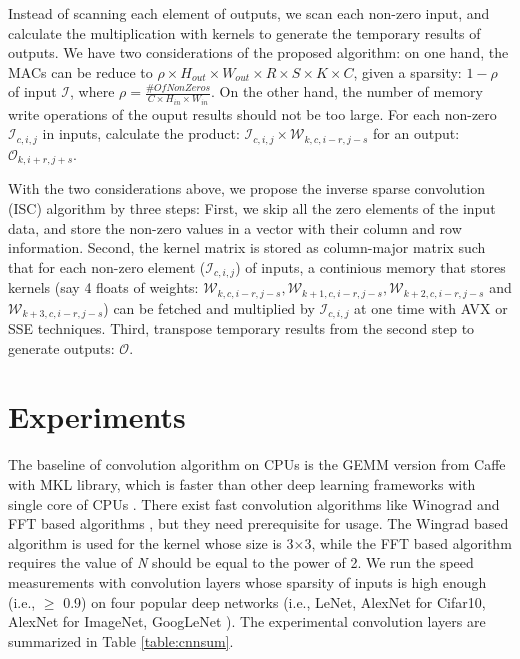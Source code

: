 \documentclass{article}
\begin{document}
Instead of scanning each element of outputs, we scan each non-zero input, and calculate the multiplication with kernels to generate the temporary results of outputs. We have two considerations of the proposed algorithm: on one hand, the MACs can be reduce to $\rho\times H_{out}\times W_{out} \times R \times S \times K \times C$, given a sparsity: $1-\rho$ of input $\mathcal{I}$, where $\rho=\frac{\#OfNonZeros}{C\times H_{in}\times W_{in}}$. On the other hand, the number of memory write operations of the ouput results should not be too large. For each non-zero $\mathcal{I}_{c,i,j}$ in inputs, calculate the product: $\mathcal{I}_{c,i,j}\times \mathcal{W}_{k,c,i-r,j-s}$ for an output: $\mathcal{O}_{k,i+r,j+s}$. 

With the two considerations above, we propose the inverse sparse convolution (ISC) algorithm by three steps: First, we skip all the zero elements of the input data, and store the non-zero values in a vector with their column and row information. Second, the kernel matrix is stored as column-major matrix such that for each non-zero element ($\mathcal{I}_{c,i,j}$) of inputs, a continious memory that stores kernels (say 4 floats of weights: $\mathcal{W}_{k,c,i-r,j-s},\mathcal{W}_{k+1,c,i-r,j-s},\mathcal{W}_{k+2,c,i-r,j-s}$ and $\mathcal{W}_{k+3,c,i-r,j-s}$) can be fetched and multiplied by $\mathcal{I}_{c,i,j}$ at one time with AVX or SSE techniques. Third, transpose temporary results from the second step to generate outputs: $\mathcal{O}$. 

\section{Experiments}
The baseline of convolution algorithm on CPUs is the GEMM version from Caffe \cite{jia2014caffe} with MKL library, which is faster than other deep learning frameworks with single core of CPUs \cite{shi2016benchmarking}. There exist fast convolution algorithms like Winograd and FFT based algorithms \cite{lavin2016fast}, but they need prerequisite for usage. The Wingrad based algorithm is used for the kernel whose size is 3$\times$3, while the FFT based algorithm requires the value of \textit{N} should be equal to the power of 2. We run the speed measurements with convolution layers whose sparsity of inputs is high enough (i.e., $\geq$ 0.9) on four popular deep networks (i.e., LeNet, AlexNet for Cifar10, AlexNet \cite{krizhevsky2012imagenet} for ImageNet, GoogLeNet \cite{szegedy2015going}). The experimental convolution layers are summarized in Table \ref{table:cnnsum}.
\end{document}
